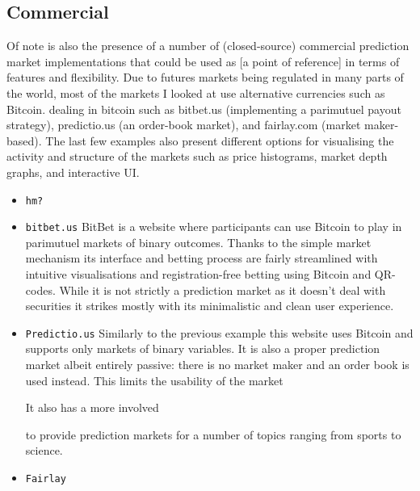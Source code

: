 \documentclass[bsc,frontabs,twoside,singlespacing,parskip,deptreport]{infthesis}     %
\begin{document}

\subsection{ Commercial }
	Of note is also the presence of a number of (closed-source) commercial prediction market implementations that could be used as [a point of reference] in terms of features and flexibility. Due to futures markets being regulated in many parts of the world, most of the markets I looked at use alternative currencies such as Bitcoin. 
 dealing in bitcoin such as bitbet.us (implementing a parimutuel payout strategy), predictio.us (an order-book market), and fairlay.com (market maker-based). The last few examples also present different options for visualising the activity and structure of the markets such as price histograms, market depth graphs, and interactive UI.
\begin{itemize}

\item {\tt hm? }

\item {\tt bitbet.us}
	BitBet is a website where participants can use Bitcoin to play in parimutuel markets of binary outcomes. Thanks to the simple market mechanism its interface and betting process are fairly streamlined with intuitive visualisations and registration-free betting using Bitcoin and QR-codes. While it is not strictly a prediction market as it doesn't deal with securities it strikes mostly with its minimalistic and clean user experience. 

\item {\tt Predictio.us}
	Similarly to the previous example this website uses Bitcoin and supports only markets of binary variables. It is also a proper prediction market albeit entirely passive: there is no market maker and an order book is used instead. This limits the usability of the market 

	It also has a more involved 

to provide prediction markets for a number of topics ranging from sports to science. 
\item {\tt Fairlay}	
	

\end{itemize}
\end{document}
